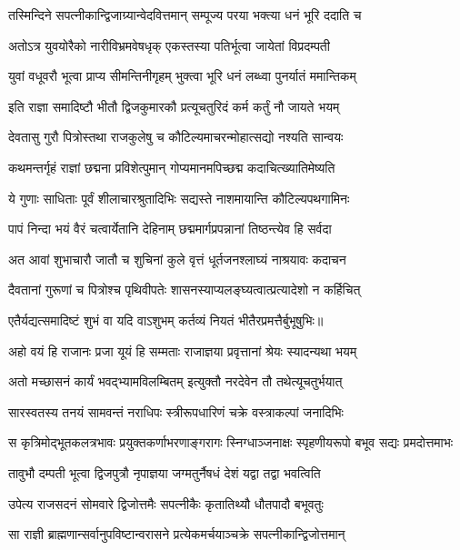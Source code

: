 \twolineshloka
{तस्मिन्दिने सपत्नीकान्द्विजाग्र्यान्वेदवित्तमान्}
{सम्पूज्य परया भक्त्या धनं भूरि ददाति च} %

\twolineshloka
{अतोऽत्र युवयोरैको नारीविभ्रमवेषधृक्}
{एकस्तस्या पतिर्भूत्वा जायेतां विप्रदम्पती} %

\twolineshloka
{युवां वधूवरौ भूत्वा प्राप्य सीमन्तिनीगृहम्}
{भुक्त्वा भूरि धनं लब्ध्वा पुनर्यातं ममान्तिकम्} %

\twolineshloka
{इति राज्ञा समादिष्टौ भीतौ द्विजकुमारकौ}
{प्रत्यूचतुरिदं कर्म कर्तुं नौ जायते भयम्} %

\twolineshloka
{देवतासु गुरौ पित्रोस्तथा राजकुलेषु च}
{कौटिल्यमाचरन्मोहात्सद्यो नश्यति सान्वयः} %

\twolineshloka
{कथमन्तर्गृहं राज्ञां छद्मना प्रविशेत्पुमान्}
{गोप्यमानमपिच्छद्म कदाचित्ख्यातिमेष्यति} %

\twolineshloka
{ये गुणाः साधिताः पूर्वं शीलाचारश्रुतादिभिः}
{सद्यस्ते नाशमायान्ति कौटिल्यपथगामिनः} %

\twolineshloka
{पापं निन्दा भयं वैरं चत्वार्येतानि देहिनाम्}
{छद्ममार्गप्रपन्नानां तिष्ठन्त्येव हि सर्वदा} %

\twolineshloka
{अत आवां शुभाचारौ जातौ च शुचिनां कुले}
{वृत्तं धूर्तजनश्लाघ्यं नाश्रयावः कदाचन} %

\twolineshloka
{दैवतानां गुरूणां च पित्रोश्च पृथिवीपतेः}
{शासनस्याप्यलङ्घ्यत्वात्प्रत्यादेशो न कर्हिचित्} %

\twolineshloka
{एतैर्यद्यत्समादिष्टं शुभं वा यदि वाऽशुभम्}
{कर्तव्यं नियतं भीतैरप्रमत्तैर्बुभूषुभिः॥} %

\twolineshloka
{अहो वयं हि राजानः प्रजा यूयं हि सम्मताः}
{राजाज्ञया प्रवृत्तानां श्रेयः स्यादन्यथा भयम्} %

\twolineshloka
{अतो मच्छासनं कार्यं भवद्भ्यामविलम्बितम्}
{इत्युक्तौ नरदेवेन तौ तथेत्यूचतुर्भयात्} %

\twolineshloka
{सारस्वतस्य तनयं सामवन्तं नराधिपः}
{स्त्रीरूपधारिणं चक्रे वस्त्राकल्पां जनादिभिः} %

\fourlineindentedshloka
{स कृत्रिमोद्भूतकलत्रभावः}
{प्रयुक्तकर्णाभरणाङ्गरागः}
{स्निग्धाञ्जनाक्षः स्पृहणीयरूपो}
{बभूव सद्यः प्रमदोत्तमाभः} %

\twolineshloka
{तावुभौ दम्पती भूत्वा द्विजपुत्रौ नृपाज्ञया}
{जग्मतुर्नैषधं देशं यद्वा तद्वा भवत्विति} %

\twolineshloka
{उपेत्य राजसदनं सोमवारे द्विजोत्तमैः}
{सपत्नीकैः कृतातिथ्यौ धौतपादौ बभूवतुः} %

\twolineshloka
{सा राज्ञी ब्राह्मणान्सर्वानुपविष्टान्वरासने}
{प्रत्येकमर्चयाञ्चक्रे सपत्नीकान्द्विजोत्तमान्} %

